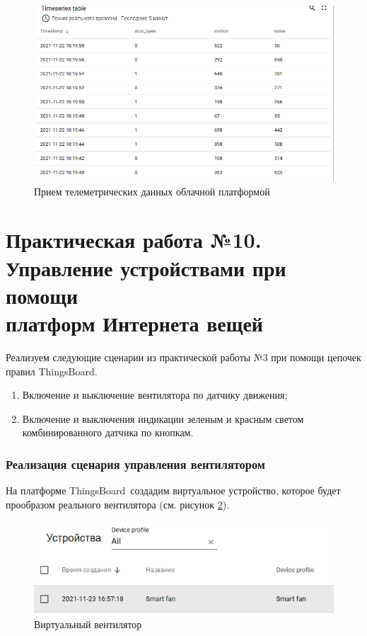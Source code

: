 \documentclass[a4paper,14pt]{extarticle}
\newcommand{\tb}{ThingsBoard~}
\begin{document}
\begin{figure}[h!]
	\centering
	\includegraphics[width=0.6\linewidth]{images/dop9-recieve}
	\caption{Прием телеметрических данных облачной платформой}
	\label{fig:dop9-recieve}
\end{figure}
\hfill\newpage\hfill\newpage

\section{Практическая работа №10. \\Управление устройствами при помощи \\платформ Интернета вещей}

Реализуем следующие сценарии из практической работы №3 при помощи цепочек правил ThingsBoard.

\begin{enumerate}
	\item Включение и выключение вентилятора по датчику движения;
	\item Включение и выключения индикации зеленым и красным светом комбинированного датчика по кнопкам.
\end{enumerate}

\subsubsection*{Реализация сценария управления вентилятором}
На платформе \tb создадим виртуальное устройство, которое будет прообразом реального вентилятора (см. рисунок \ref{fig:dev}).

\begin{figure}[h!]
	\centering
	\includegraphics[width=0.5\linewidth]{images/dev}
	\caption{Виртуальный вентилятор}
	\label{fig:dev}
\end{figure}
\end{document}
